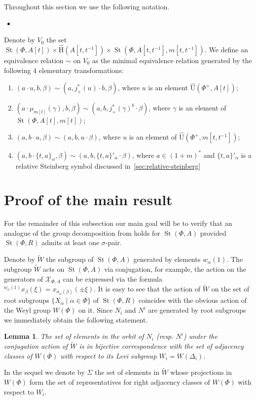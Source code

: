 \documentclass[oneside, 10pt]{amsart}
\DeclareMathOperator{\St}{St}
\newcommand{\UU}{\hat{\mathrm{U}}}      %
\newcommand{\StH}{\hat{\mathrm{H}}}     %
\newcommand{\ext}[1]{\mu_{#1}}           %
\numberwithin{equation}{section}
\newtheorem{lemma}{Lemma}
\numberwithin{lemma}{section}
\theoremstyle{definition}
\theoremstyle{remark}
\begin{document}
Throughout this section we use the following notation.
\begin{itemize}
 \item 
\end{itemize}

Denote by $V_0$ the set $\St(\Phi, A[t]) \times \StH(A[t, t^{-1}]) \times \St(\Phi, A[t, t^{-1}], m[t, t^{-1}])$. 
We define an equivalence relation $\sim$ on $V_0$ as the minimal equivalence relation generated by the following 4 elementary transformations:
\begin{enumerate}
 \item $(a \cdot u, b, \beta) \sim (a, j_+^*(u) \cdot b, \beta)$, where $u$ is an element $\UU(\Phi^+, A[t])$;
 \item $(a \cdot \ext{m[t]}(\gamma), b, \beta) \sim (a, b, j^*_+(\gamma)^b \cdot \beta)$, where $\gamma$ is an element of $\St(\Phi, A[t], m[t])$;
 \item $(a, b \cdot u, \beta) \sim (a, b, u\cdot \beta)$, where $u$ is an element of $\UU(\Phi^+, m[t, t^{-1}])$;
 \item $(a, b \cdot \{ t, a \}_\alpha, \beta) \sim (a, b, \{ t, a \}'_\alpha \cdot \beta) $, where $a \in (1+m)^*$
  and $\{t, a\}'_\alpha$ is a relative Steinberg symbol discussed in~\cref{sec:relative-steinberg}
\end{enumerate}

\section{Proof of the main result}
For the remainder of this subsection our main goal will be to verify that an analogue of the group decomposition from \cite[Lemma~3.1f]{Tu83} holds for $\St(\Phi, A)$
 provided $\St(\Phi, R)$ admits at least one $\sigma$-pair.

Denote by $\widetilde{W}$ the subgroup of $\St(\Phi, A)$ generated by elements $w_\alpha(1)$.
The subgroup $\widetilde{W}$ acts on $\St(\Phi, A)$ via conjugation, for example, 
 the action on the generators of $\mathcal{X}_{\Phi, A}$ can be expressed via the formula ${}^{w_\alpha(1)} \!x_{\beta}(\xi) = x_{\sigma_{\alpha}(\beta)} ( \pm \xi)$.
It is easy to see that the action of $\widetilde{W}$ on the set of root subgroups $\{X_\alpha \mid \alpha \in \Phi \}$ of $\St(\Phi, R)$ coincides with the obvious
 action of the Weyl group $W(\Phi)$ on it. Since $N_i$ and $N^i$ are generated by root subgroups we immediately obtain the following statement.
\begin{lemma} The set of elements in the orbit of $N_i$ (resp. $N^i$) under the conjugation action of $\widetilde{W}$ 
is in bijective correspondence with 
the set of adjacency classes of $W(\Phi)$ with respect to its Levi subgroup $W_i = W(\Delta_i)$. %
\end{lemma}
In the sequel we denote by $\Sigma$ the set of elements in $\widetilde{W}$ whose projections in $W(\Phi)$ form the set of representatives for
 right adjacency classes of $W(\Phi)$ with respect to $W_i$. %
\end{document}
